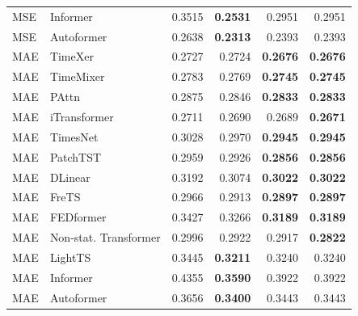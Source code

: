 \begin{longtable}{llrrrr}
MSE & Informer & 0.3515 & \textbf{0.2531} & 0.2951 & 0.2951 \\
MSE & Autoformer & 0.2638 & \textbf{0.2313} & 0.2393 & 0.2393 \\
\midrule
MAE & TimeXer & 0.2727 & 0.2724 & \textbf{0.2676} & \textbf{0.2676} \\
MAE & TimeMixer & 0.2783 & 0.2769 & \textbf{0.2745} & \textbf{0.2745} \\
MAE & PAttn & 0.2875 & 0.2846 & \textbf{0.2833} & \textbf{0.2833} \\
MAE & iTransformer & 0.2711 & 0.2690 & 0.2689 & \textbf{0.2671} \\
MAE & TimesNet & 0.3028 & 0.2970 & \textbf{0.2945} & \textbf{0.2945} \\
MAE & PatchTST & 0.2959 & 0.2926 & \textbf{0.2856} & \textbf{0.2856} \\
MAE & DLinear & 0.3192 & 0.3074 & \textbf{0.3022} & \textbf{0.3022} \\
MAE & FreTS & 0.2966 & 0.2913 & \textbf{0.2897} & \textbf{0.2897} \\
MAE & FEDformer & 0.3427 & 0.3266 & \textbf{0.3189} & \textbf{0.3189} \\
MAE & Non-stat. Transformer & 0.2996 & 0.2922 & 0.2917 & \textbf{0.2822} \\
MAE & LightTS & 0.3445 & \textbf{0.3211} & 0.3240 & 0.3240 \\
MAE & Informer & 0.4355 & \textbf{0.3590} & 0.3922 & 0.3922 \\
MAE & Autoformer & 0.3656 & \textbf{0.3400} & 0.3443 & 0.3443 \\
\end{longtable}
\endgroup

